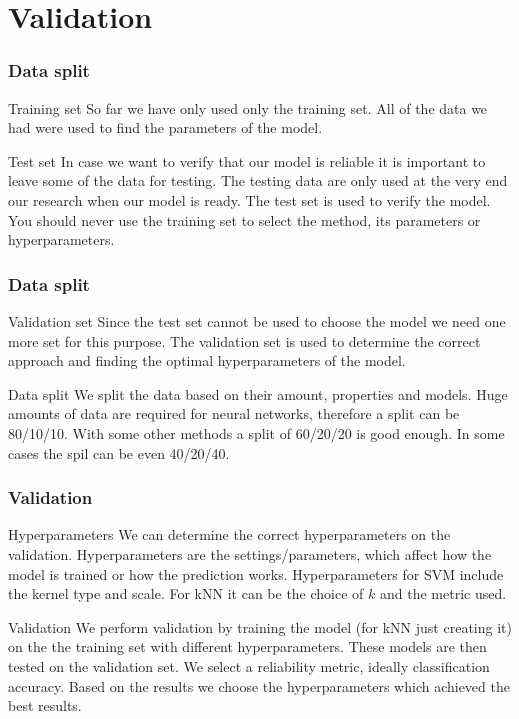 \documentclass{beamer}
\begin{document}
\section{Validation}
\begin{frame}
\frametitle{Data split}
\begin{block}{Training set}
So far we have only used only the training set. All of the data we had were used to find the parameters of the model.
\end{block}

\begin{block}{Test set}
In case we want to verify that our model is reliable it is important to leave some of the data for testing. The testing data are only used at the very end our research when our model is ready. The test set is used to verify the model. You should never use the training set to select the method, its parameters or hyperparameters.
\end{block}
\end{frame}


\begin{frame}
\frametitle{Data split}
\begin{block}{Validation set}
Since the test set cannot be used to choose the model we need one more set for this purpose. The validation set is used to determine the correct approach and finding the optimal hyperparameters of the model.
\end{block}

\begin{block}{Data split}
We split the data based on their amount, properties and models. Huge amounts of data are required for neural networks, therefore a split can be 80/10/10. With some other methods a split of 60/20/20 is good enough. In some cases the spil can be even 40/20/40.
\end{block}
\end{frame}


\begin{frame}
\frametitle{Validation}
\begin{block}{Hyperparameters}
We can determine the correct hyperparameters on the validation. Hyperparameters are the settings/parameters, which affect how the model is trained or how the prediction works. Hyperparameters for SVM include the kernel type and scale. For kNN it can be the choice of $k$ and the metric used.
\end{block}

\begin{block}{Validation}
We perform validation by training the model (for kNN just creating it) on the the training set with different hyperparameters. These models are then tested on the validation set. We select a reliability metric, ideally classification accuracy. Based on the results we choose the hyperparameters which achieved the best results.
\end{block}
\end{frame}
\end{document}
